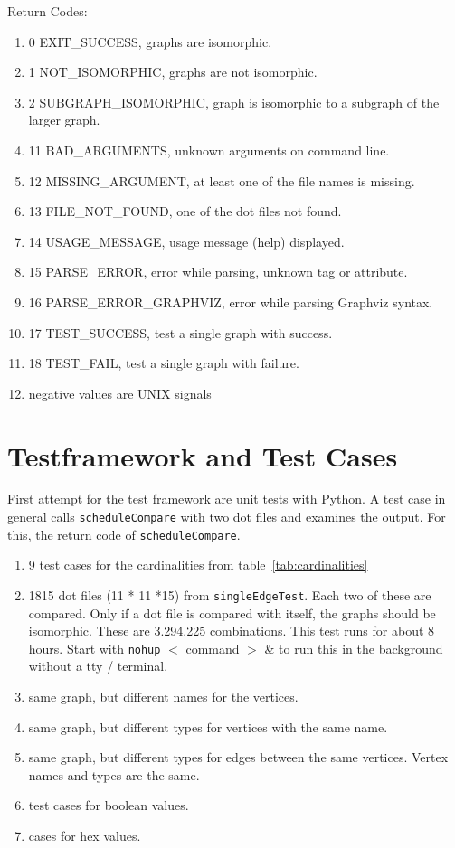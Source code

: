 \documentclass[12pt,a4paper]{report}
\begin{document}
Return Codes:
\begin{enumerate}
  \item 0 EXIT\_SUCCESS, graphs are isomorphic.
  \item 1 NOT\_ISOMORPHIC, graphs are not isomorphic.
  \item 2 SUBGRAPH\_ISOMORPHIC, graph is isomorphic to a subgraph of the larger graph.
  \item 11 BAD\_ARGUMENTS, unknown arguments on command line.
  \item 12 MISSING\_ARGUMENT, at least one of the file names is missing.
  \item 13 FILE\_NOT\_FOUND, one of the dot files not found.
  \item 14 USAGE\_MESSAGE, usage message (help) displayed.
  \item 15 PARSE\_ERROR, error while parsing, unknown tag or attribute.
  \item 16 PARSE\_ERROR\_GRAPHVIZ, error while parsing Graphviz syntax.
  \item 17 TEST\_SUCCESS, test a single graph with success.
  \item 18 TEST\_FAIL, test a single graph with failure.
  \item negative values are UNIX signals
\end{enumerate}

\chapter{Testframework and Test Cases}
First attempt for the test framework are unit tests with Python. A test case in general calls \texttt{scheduleCompare} with two dot files and examines the output. For this, the return code of \texttt{scheduleCompare}.

\begin{enumerate}
  \item 9 test cases for the cardinalities from table~\ref{tab:cardinalities}
  \item 1815 dot files (11 * 11 *15) from \texttt{singleEdgeTest}. Each two of these are compared. Only if a dot file is compared with itself, the graphs should be isomorphic. These are 3.294.225 combinations.
This test runs for about 8 hours. Start with \texttt{nohup} $<$ command $>$ \& to run this in the background without a tty / terminal.
  \item same graph, but different names for the vertices.
  \item same graph, but different types for vertices with the same name.
  \item same graph, but different types for edges between the same vertices. Vertex names and types are the same.
  \item test cases for boolean values.
  \item cases for hex values.
\end{enumerate}
\end{document}
